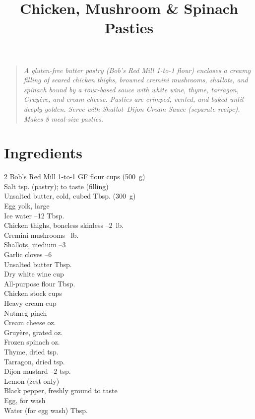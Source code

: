 \documentclass[11pt,letterpaper]{article}
\title{Chicken, Mushroom \& Spinach Pasties}
\author{}
\date{}
\begin{document}
\maketitle
\thispagestyle{empty}

\begin{quote}
\textit{A gluten-free butter pastry (Bob's Red Mill 1-to-1 flour) encloses a creamy filling of seared chicken thighs, browned cremini mushrooms, shallots, and spinach bound by a roux-based sauce with white wine, thyme, tarragon, Gruyère, and cream cheese. Pasties are crimped, vented, and baked until deeply golden. Serve with Shallot--Dijon Cream Sauce (separate recipe). Makes 8 meal-size pasties.}
\end{quote}

\section*{Ingredients}
\setlength{\columnsep}{20pt}
\begin{multicols}{2}
\noindent
    Bob's Red Mill 1-to-1 GF flour  cups (500~g) \\
    Salt  tsp. (pastry); to taste (filling) \\
    Unsalted butter, cold, cubed  Tbsp. (300~g) \\
    Egg yolk, large  \\
    Ice water --12 Tbsp. \\
    Chicken thighs, boneless skinless --2~lb. \\
    Cremini mushrooms ~lb. \\
    Shallots, medium --3 \\
    Garlic cloves --6 \\
    Unsalted butter  Tbsp. \\
    Dry white wine \dotfill {} cup \\
    All-purpose flour  Tbsp. \\
    Chicken stock  cups \\
    \columnbreak
    Heavy cream \dotfill {} cup \\
    Nutmeg \dotfill pinch \\
    Cream cheese  oz. \\
    Gruyère, grated  oz. \\
    Frozen spinach  oz. \\
    Thyme, dried  tsp. \\
    Tarragon, dried  tsp. \\
    Dijon mustard --2 tsp. \\
    Lemon  (zest only) \\
    Black pepper, freshly ground \dotfill to taste \\
    Egg, for wash  \\
    Water (for egg wash)  Tbsp.
\end{multicols}
\end{document}
